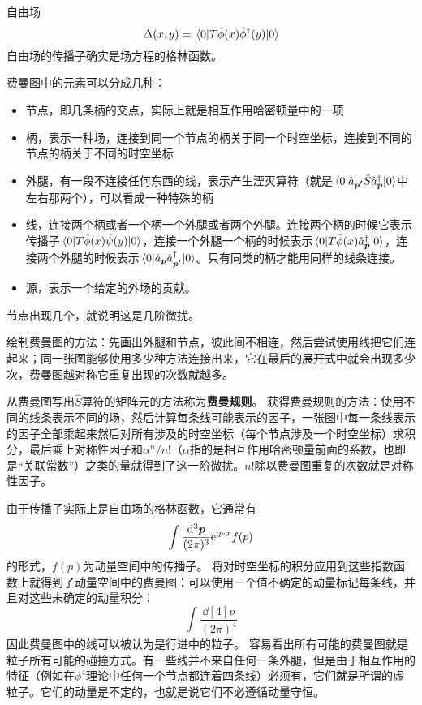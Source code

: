\documentclass[hyperref, UTF8, a4paper]{ctexart}
\newcommand*{\ii}{\mathrm{i}}
\newcommand*{\ee}{\mathrm{e}}
\begin{document}
自由场
\begin{equation}
    \Delta (x, y) = \mel{0}{T \hat{\phi} (x) \hat{\phi}^\dagger(y) }{0}
\end{equation}
自由场的传播子确实是场方程的格林函数。

费曼图中的元素可以分成几种：
\begin{itemize}
    \item 节点，即几条柄的交点，实际上就是相互作用哈密顿量中的一项
    \item 柄，表示一种场，连接到同一个节点的柄关于同一个时空坐标，连接到不同的节点的柄关于不同的时空坐标
    \item 外腿，有一段不连接任何东西的线，表示产生湮灭算符（就是$\mel{0}{\hat{a}_{\vb*{p'}}\hat{S}\hat{a}^\dagger_{\vb*{p}}}{0}$中左右那两个），可以看成一种特殊的柄
    \item 线，连接两个柄或者一个柄一个外腿或者两个外腿。连接两个柄的时候它表示传播子$\mel{0}{T\hat{\phi}(x)\hat{\psi}(y)}{0}$，连接一个外腿一个柄的时候表示$\mel{0}{T\hat{\phi}(x)\hat{a}^\dagger_{\vb*{p}}}{0}$，连接两个外腿的时候表示$\mel{0}{\hat{a}_{\vb*{p}}\hat{a}^\dagger_{\vb*{p'}}}{0}$。只有同类的柄才能用同样的线条连接。
    \item 源，表示一个给定的外场的贡献。
\end{itemize}
节点出现几个，就说明这是几阶微扰。

绘制费曼图的方法：先画出外腿和节点，彼此间不相连，然后尝试使用线把它们连起来；同一张图能够使用多少种方法连接出来，它在最后的展开式中就会出现多少次，费曼图越对称它重复出现的次数就越多。

从费曼图写出$\hat{S}$算符的矩阵元的方法称为\textbf{费曼规则}。
获得费曼规则的方法：使用不同的线条表示不同的场，然后计算每条线可能表示的因子，一张图中每一条线表示的因子全部乘起来然后对所有涉及的时空坐标（每个节点涉及一个时空坐标）求积分，最后乘上对称性因子和$\alpha^n/n!$（$\alpha$指的是相互作用哈密顿量前面的系数，也即是“关联常数”）之类的量就得到了这一阶微扰。$n!$除以费曼图重复的次数就是对称性因子。

由于传播子实际上是自由场的格林函数，它通常有
\[
    \int \frac{\dd[3]{\vb*{p}}}{(2\pi)^3} \ee^{\ii p \cdot x} f(p)
\]
的形式，$f(p)$为动量空间中的传播子。
将对时空坐标的积分应用到这些指数函数上就得到了动量空间中的费曼图：可以使用一个值不确定的动量标记每条线，并且对这些未确定的动量积分：
\[
    \int \frac{\dd[4]p}{(2\pi)^4}
\]
因此费曼图中的线可以被认为是行进中的粒子。
容易看出所有可能的费曼图就是粒子所有可能的碰撞方式。有一些线并不来自任何一条外腿，但是由于相互作用的特征（例如在$\phi^4$理论中任何一个节点都连着四条线）必须有，它们就是所谓的虚粒子。它们的动量是不定的，也就是说它们不必遵循动量守恒。
\end{document}
